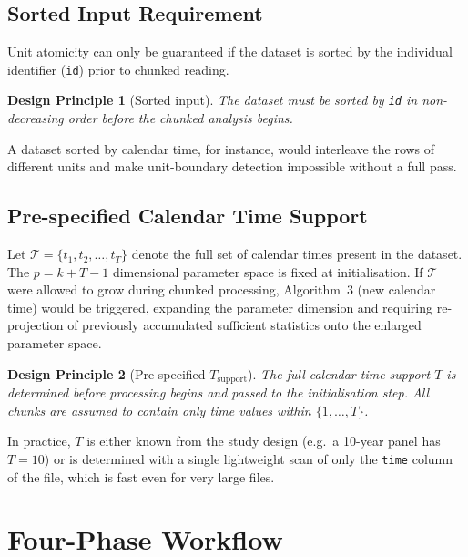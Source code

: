 \documentclass[11pt, a4paper]{article}
\newtheorem{principle}{Design Principle}
\begin{document}
\subsection{Sorted Input Requirement}

Unit atomicity can only be guaranteed if the dataset is sorted by the
individual identifier (\texttt{id}) prior to chunked reading.

\begin{principle}[Sorted input]
The dataset must be sorted by \texttt{id} in non-decreasing order before the
chunked analysis begins.
\end{principle}

A dataset sorted by calendar time, for instance, would interleave the rows of
different units and make unit-boundary detection impossible without a full pass.

\subsection{Pre-specified Calendar Time Support}

Let $\mathcal{T} = \{t_1, t_2, \ldots, t_T\}$ denote the full set of calendar
times present in the dataset.  The $p = k + T - 1$ dimensional parameter
space is fixed at initialisation.  If $\mathcal{T}$ were allowed to grow
during chunked processing, Algorithm~3 (new calendar time) would be triggered,
expanding the parameter dimension and requiring re-projection of previously
accumulated sufficient statistics onto the enlarged parameter space.

\begin{principle}[Pre-specified $T_{\mathrm{support}}$]
The full calendar time support $T$ is determined before processing begins and
passed to the initialisation step.  All chunks are assumed to contain only
time values within $\{1,\ldots,T\}$.
\end{principle}

In practice, $T$ is either known from the study design (e.g.\ a 10-year panel
has $T = 10$) or is determined with a single lightweight scan of only the
\texttt{time} column of the file, which is fast even for very large files.

\section{Four-Phase Workflow}
\end{document}
